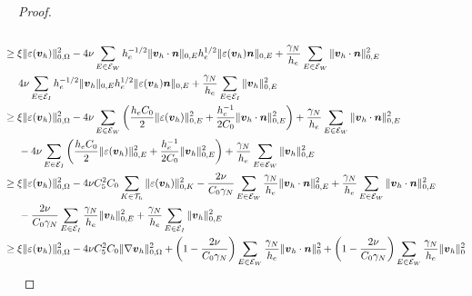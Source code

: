 \documentclass[10pt,a4paper]{article}
\begin{document}
\begin{proof}
\begin{align*}
  			 \\  & \hspace{-5mm} \geq \xi \| \varepsilon( \boldsymbol{v}_h) \|^2_{0,\Omega} - 4 \nu \sum_{E \in \mathcal{E}_W} h_e^{-1/2} \|\boldsymbol{v}_h \cdot \boldsymbol{n} \|_{0,E} h_e^{1/2} \| \varepsilon(\boldsymbol{v}_h) \boldsymbol{n} \|_{0,E} +  \frac{\gamma_N}{h_e} \sum_{E \in \mathcal{E}_W} \|\boldsymbol{v}_h \cdot \boldsymbol{n} \|_{0,E}^2 \\& \- 4 \nu \sum_{E \in \mathcal{E}_I} h_e^{-1/2} \|\boldsymbol{v}_h \|_{0,E} h_e^{1/2} \| \varepsilon(\boldsymbol{v}_h) \boldsymbol{n} \|_{0,E} +  \frac{\gamma_N}{h_e} \sum_{E \in \mathcal{E}_I} \|\boldsymbol{v}_h  \|_{0,E}^2  \\ & \hspace{-5mm}
  			\geq \xi \| \varepsilon( \boldsymbol{v}_h) \|^2_{0,\Omega} - 4 \nu  \sum_{E \in \mathcal{E}_W} \left( \frac{h_e C_0}{2} \| \varepsilon(\boldsymbol{v}_h)  \|_{0,E}^2   +   \frac{h_e^{-1}}{2 C_0}  \|\boldsymbol{v}_h \cdot \boldsymbol{n} \|_{0,E}^2 \right)+  \frac{\gamma_N}{h_e} \sum_{E \in \mathcal{E}_W} \|\boldsymbol{v}_h \cdot \boldsymbol{n} \|_{0,E}^2 \\ & - 4 \nu  \sum_{E \in \mathcal{E}_I} \left( \frac{h_e C_0}{2} \| \varepsilon(\boldsymbol{v}_h)  \|_{0,E}^2   +   \frac{h_e^{-1}}{2 C_0}  \|\boldsymbol{v}_h \|_{0,E}^2 \right)+  \frac{\gamma_N}{h_e} \sum_{E \in \mathcal{E}_W} \|\boldsymbol{v}_h \|_{0,E}^2   \\ & \hspace{-5mm}
  			\geq \xi \| \varepsilon( \boldsymbol{v}_h) \|^2_{0,\Omega} - 4 \nu {C_{5}^2}{C_0} \sum_{K \in \mathcal{T}_h} \| \varepsilon(\boldsymbol{v}_h)  \|_{0,K}^2 -  
  			 \frac{2 \nu}{C_0 \gamma_N} \sum_{E \in \mathcal{E}_W} \frac{\gamma_N}{h_e}	\|\boldsymbol{v}_h \cdot \boldsymbol{n} \|_{0,E}^2  +  \frac{\gamma_N}{h_e} \sum_{E \in \mathcal{E}_W} \|\boldsymbol{v}_h \cdot \boldsymbol{n} \|_{0,E}^2 \\&  -  
  			 \frac{2 \nu}{C_0 \gamma_N} \sum_{E \in \mathcal{E}_I} \frac{\gamma_N}{h_e}	\|\boldsymbol{v}_h  \|_{0,E}^2  +  \frac{\gamma_N}{h_e} \sum_{E \in \mathcal{E}_I} \|\boldsymbol{v}_h \|_{0,E}^2  
  	         \\  & \hspace{-5mm} \geq \xi \| \varepsilon( \boldsymbol{v}_h) \|^2_{0,\Omega} - {4 \nu C_{5}^2}{C_0} \| \nabla \boldsymbol{v}_h \|^2_{0,\Omega} +  \left(1-\frac{2 \nu }{C_0 \gamma_N}\right) \sum_{E \in \mathcal{E}_W} \frac{\gamma_N}{h_e} \|\boldsymbol{v}_h \cdot \boldsymbol{n} \|_{0}^2 +  \left(1-\frac{2 \nu }{C_0 \gamma_N}\right) \sum_{E \in \mathcal{E}_W} \frac{\gamma_N}{h_e} \|\boldsymbol{v}_h \|_{0}^2 

\end{align*}
\end{proof}
\end{document}
